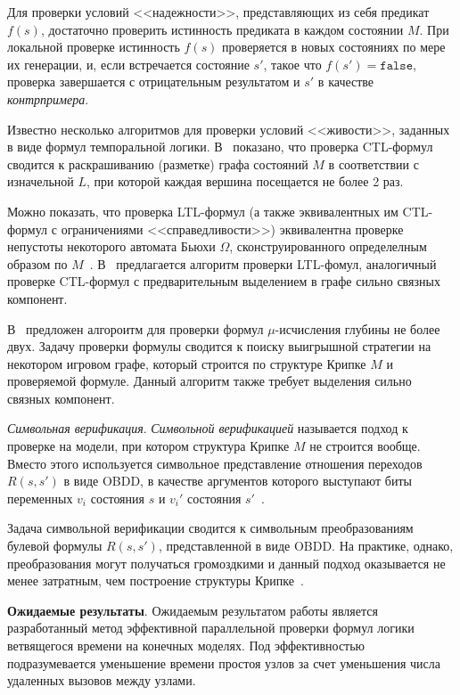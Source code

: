 \documentclass[a4paper,notitlepage,14pt]{article}
\begin{document}
Для проверки условий <<надежности>>, представляющих из себя предикат $f(s)$, достаточно
проверить истинность предиката в каждом состоянии $M$. При локальной проверке истинность
$f(s)$ проверяется в новых состояниях по мере их генерации, и, если встречается состояние
$s'$, такое что $f(s') = \mathtt{false}$, проверка завершается с отрицательным результатом
и $s'$ в качестве \emph{контрпримера}.

Известно несколько алгоритмов для проверки условий <<живости>>, заданных в виде формул
темпоральной логики. В~\cite{Bhat95efficienton-the-fly} показано, что проверка CTL-формул
сводится к раскрашиванию (разметке) графа состояний $M$ в соответствии с изначельной $L$,
при которой каждая вершина посещается не более 2 раз.

Можно показать, что проверка LTL-формул (а также эквивалентных им CTL-формул с
ограничениями <<справедливости>>) эквивалентна проверке непустоты некоторого автомата
Бьюхи $\Omega$, сконструированного определелным образом по
$M$~\cite{Katoen}. В~\cite{Clarke97anotherlook} предлагается алгоритм проверки LTL-фомул,
аналогичный проверке CTL-формул с предварительным выделением в графе сильно связных
компонент.

В~\cite{Bollig_localparallel,Leucker_parallelmodel} предложен алгороитм для проверки
формул $\mu$-исчисления глубины не более двух. Задачу проверки формулы сводится к поиску
выигрышной стратегии на некотором игровом графе, который строится по структуре Крипке $M$
и проверяемой формуле. Данный алгоритм также требует выделения сильно связных компонент.

\textit{Символьная верификация}. \emph{Символьной верификацией} называется подход к
проверке на модели, при котором структура Крипке $M$ не строится вообще. Вместо этого
используется символьное представление отношения переходов $R(s, s')$ в виде OBDD, в
качестве аргументов которого выступают биты переменных $v_i$ состояния $s$ и $v_i'$
состояния $s'$~\cite{Clarke}.

Задача символьной верификации сводится к символьным преобразованиям булевой формулы $R(s,
s')$, представленной в виде OBDD. На практике, однако, преобразования могут получаться
громоздкими и данный подход оказывается не менее затратным, чем построение структуры
Крипке~\cite{Stern97parallelizingthe}.


\textbf{Ожидаемые результаты}. Ожидаемым результатом работы является разработанный метод
эффективной параллельной проверки формул логики ветвящегося времени на конечных
моделях. Под эффективностью подразумевается уменьшение времени простоя узлов за счет
уменьшения числа удаленных вызовов между узлами.
\end{document}
